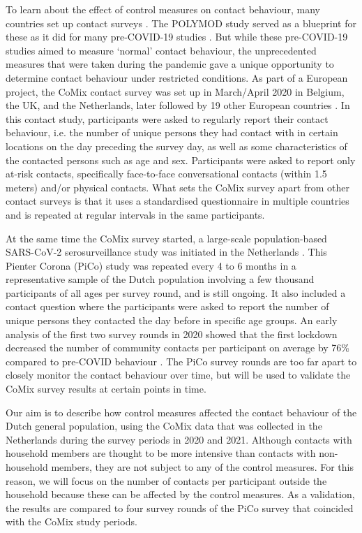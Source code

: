 \documentclass[fleqn,10pt]{wlscirep}
\begin{document}
To learn about the effect of control measures on contact behaviour, many countries set up contact surveys \cite{Zhang_2020, Latsuzbaia_2020, Quaife_2020, Backer_2021, Bosetti_2021, Feehan_2021, Tomori_2021, Drolet_2022}. The POLYMOD study \cite{Mossong_2008} served as a blueprint for these as it did for many pre-COVID-19 studies \cite{Hoang_2019}. But while these pre-COVID-19 studies aimed to measure `normal' contact behaviour, the unprecedented measures that were taken during the pandemic gave a unique opportunity to determine contact behaviour under restricted conditions. As part of a European project, the CoMix contact survey was set up in March/April 2020 in Belgium, the UK, and the Netherlands, later followed by 19 other European countries \cite{Verelst_2021}. In this contact study, participants were asked to regularly report their contact behaviour, i.e. the number of unique persons they had contact with in certain locations on the day preceding the survey day, as well as some characteristics of the contacted persons such as age and sex. Participants were asked to report only at-risk contacts, specifically face-to-face conversational contacts (within 1.5 meters) and/or physical contacts. What sets the CoMix survey apart from other contact surveys is that it uses a standardised questionnaire in multiple countries and is repeated at regular intervals in the same participants.

At the same time the CoMix survey started, a large-scale population-based SARS-CoV-2 serosurveillance study was initiated in the Netherlands \cite{Vos_2020, Vos_2021}. This Pienter Corona (PiCo) study was repeated every 4 to 6 months in a representative sample of the Dutch population involving a few thousand participants of all ages per survey round, and is still ongoing. It also included a contact question where the participants were asked to report the number of unique persons they contacted the day before in specific age groups. An early analysis of the first two survey rounds in 2020 showed that the first lockdown decreased the number of community contacts per participant on average by 76\% compared to pre-COVID behaviour \cite{Backer_2021}. The PiCo survey rounds are too far apart to closely monitor the contact behaviour over time, but will be used to validate the CoMix survey results at certain points in time.

Our aim is to describe how control measures affected the contact behaviour of the Dutch general population, using the CoMix data that was collected in the Netherlands during the survey periods in 2020 and 2021. Although contacts with household members are thought to be more intensive than contacts with non-household members, they are not subject to any of the control measures. For this reason, we will focus on the number of contacts per participant outside the household because these can be affected by the control measures. As a validation, the results are compared to four survey rounds of the PiCo survey that coincided with the CoMix study periods.
\end{document}
